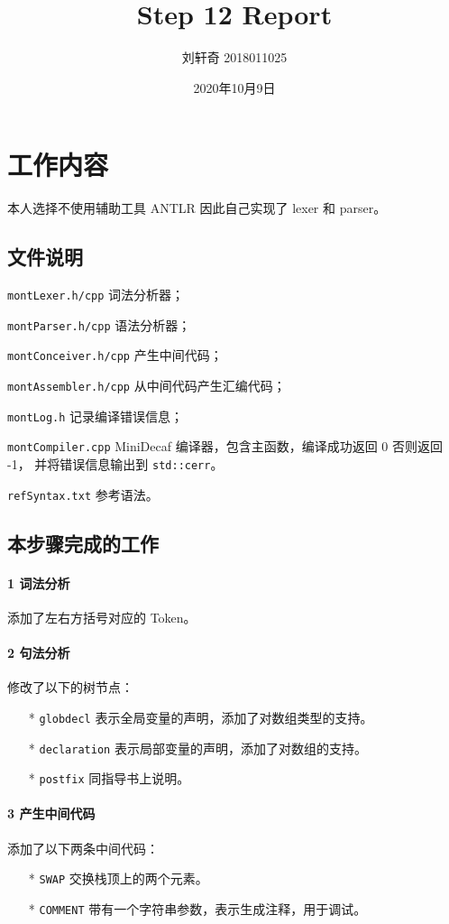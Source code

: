 \documentclass[UTF8]{ctexart}
\title{Step 12 Report}
\author{刘轩奇 2018011025}
\date{2020年10月9日}
\newcommand{\T}[1]{\texttt{{#1}}}
\begin{document}
    \maketitle
    \section{工作内容}
        本人选择不使用辅助工具 ANTLR 因此自己实现了 lexer 和 parser。
        \subsection{文件说明} 
            \T{montLexer.h/cpp} 词法分析器；

            \T{montParser.h/cpp} 语法分析器；

            \T{montConceiver.h/cpp} 产生中间代码；

            \T{montAssembler.h/cpp} 从中间代码产生汇编代码；
            
            \T{montLog.h} 记录编译错误信息；

            \T{montCompiler.cpp} MiniDecaf 编译器，包含主函数，编译成功返回 0 否则返回 -1，
            并将错误信息输出到 \T{std::cerr}。

            \T{refSyntax.txt} 参考语法。
        
        \subsection{本步骤完成的工作}

            \paragraph{1 词法分析} 添加了左右方括号对应的 Token。

            \paragraph{2 句法分析} 修改了以下的树节点：
            \begin{itemize}
                \item[*] \T{globdecl} 表示全局变量的声明，添加了对数组类型的支持。
                \item[*] \T{declaration} 表示局部变量的声明，添加了对数组的支持。
                \item[*] \T{postfix} 同指导书上说明。
            \end{itemize}

            \paragraph{3 产生中间代码} 添加了以下两条中间代码：
            \begin{itemize}
                \item[*] \T{SWAP} 交换栈顶上的两个元素。
                \item[*] \T{COMMENT} 带有一个字符串参数，表示生成注释，用于调试。
            \end{itemize}
\end{document}
